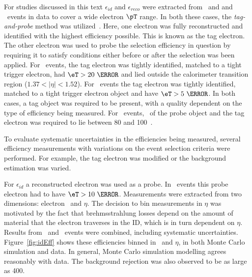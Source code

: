 \par For studies discussed in this text $\epsilon_{id}$ and $\epsilon_{reco}$ were extracted from \Zee\ and 
and \Jee\ events in data to cover a wide electron $\pT$ range. 
In both these cases, the {\it tag-and-probe} method was utilized~\cite{Aad:2011mk}. Here, one 
electron was fully reconstructed and identified with the highest efficiency 
possible. This is known as the tag electron. The other electron was used to 
probe the selection efficiency in question by requiring it to satisfy conditions 
either before or after the selection was been applied. For \Zee\ events, 
the tag electron was tightly identified, matched to a tight trigger electron, had $\eT>20~\GeV$ and  
lied outside the calorimeter transition region ($1.37<|\eta|<1.52$).
For \Jee\ events the tag electron was tightly identified, matched to a tight 
trigger electron object and have $\eT>5~\GeV$. In both cases, a tag object was required 
to be present, with a quality dependent on the type of efficiency being measured. 
For \Zee\ events, \mT\ of the probe object and the tag electron was required to lie between 80 and 100~\GeV.

\par To evaluate systematic uncertainties in the efficiencies being measured, several 
efficiency measurements with variations on the event selection criteria were 
performed. For example, the tag electron was modified or the background estimation 
was varied.  

\par For $\epsilon_{id}$ a reconstructed electron was used as a probe.
In \Zee\ events this probe electron had to have $\eT>10~\GeV$. 
Measurements were extracted from two dimensions: electron \eT\ and  
$\eta$. The decision to bin measurements in $\eta$ was motivated by the fact that brehmsstrahlung 
losses depend on the amount of material that the electron traverses in the ID, which is in turn 
dependent on $\eta$. Results from \Zee\ and \Jee\ events were combined, including systematic 
uncertainties. Figure~\ref{fig:idEff} shows these efficiencies binned 
in \eT\ and $\eta$, in both Monte Carlo simulation and data.  
In general, Monte Carlo simulation modelling agrees reasonably with data. 
The background rejection was also observed to be as large as 400. 

